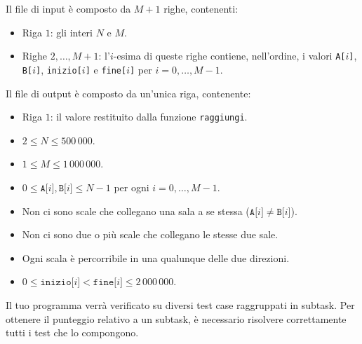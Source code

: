 Il file di input è composto da $M+1$ righe, contenenti:
\begin{itemize}[nolistsep,itemsep=2mm]
\item Riga $1$: gli interi $N$ e $M$.
\item Righe $2, \ldots, M+1$: l'$i$-esima di queste righe contiene, nell'ordine, i valori \texttt{A[$i$]}, \texttt{B[$i$]}, \texttt{inizio[$i$]} e \texttt{fine[$i$]} per $i = 0, \ldots, M-1$.
\end{itemize}

Il file di output è composto da un'unica riga, contenente:
\begin{itemize}[nolistsep,itemsep=2mm]
\item Riga $1$: il valore restituito dalla funzione \texttt{raggiungi}.
\end{itemize}



\Constraints 

\begin{itemize}[nolistsep, itemsep=2mm]
	\item $2 \le N \le 500\,000$.
	\item $1 \le M \le 1\,000\,000$.
	\item $0 \le \texttt{A[}i\texttt{]}, \texttt{B[}i\texttt{]} \le N-1$ per ogni $i=0,\ldots, M-1$.
	\item Non ci sono scale che collegano una sala a se stessa ($\texttt{A[}i\texttt{]} \neq \texttt{B[}i\texttt{]}$).
	\item Non ci sono due o più scale che collegano le stesse due sale.
    \item Ogni scala è percorribile in una qualunque delle due direzioni.
	\item $0 \le \texttt{inizio[}i\texttt{]} < \texttt{fine[}i\texttt{]} \le 2\,000\,000$.
\end{itemize}



\Scoring

Il tuo programma verrà verificato su diversi test case raggruppati in subtask.
Per ottenere il punteggio relativo a un subtask, è necessario risolvere correttamente tutti i test che lo compongono.

